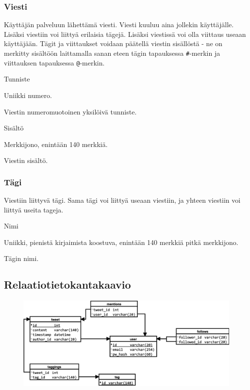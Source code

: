 \documentclass{article}
\begin{document}
\subsubsection{Viesti}

Käyttäjän palveluun lähettämä viesti. Viesti kuuluu aina jollekin käyttäjälle. Lisäksi viestiin voi liittyä erilaisia tägejä. Lisäksi viestissä voi olla viittaus useaan käyttäjään. Tägit ja viittaukset voidaan päätellä viestin sisällöstä - ne on merkitty sisältöön laittamalla sanan eteen tägin tapauksessa \verb+#+-merkin ja viittauksen tapauksessa \verb+@+-merkin.

\begin{description}[itemsep=0pt]
    \item[Attribuutti] Tunniste
    \item[Arvojoukko] Uniikki numero.
    \item[Kuvailu] Viestin numeromuotoinen yksilöivä tunniste.
\end{description}

\begin{description}[itemsep=0pt]
    \item[Attribuutti] Sisältö
    \item[Arvojoukko] Merkkijono, enintään 140 merkkiä.
    \item[Kuvailu] Viestin sisältö.
\end{description}

\subsubsection{Tägi}

Viestiin liittyvä tägi. Sama tägi voi liittyä useaan viestiin, ja yhteen viestiin voi liittyä useita tageja.

\begin{description}[itemsep=0pt]
    \item[Attribuutti] Nimi
    \item[Arvojoukko] Uniikki, pienistä kirjaimista koostuva, enintään 140 merkkiä pitkä merkkijono.
    \item[Kuvailu] Tägin nimi.
\end{description}

\subsection{Relaatiotietokantakaavio}

\begin{figure}[H]
    \centering
    \includegraphics[width=\textwidth]{tietokanta.pdf}
\end{figure}
\end{document}
